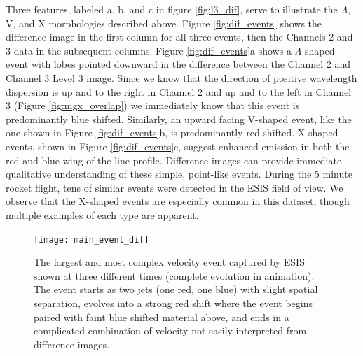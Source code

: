     	Three features, labeled a, b, and c in figure \ref{fig:l3_dif}, serve to illustrate the $\Lambda$, V, and X morphologies described above.
    	Figure \ref{fig:dif_events} shows the difference image in the first column for all three events, then the Channels 2 and 3 data in the subsequent columns. 
    	Figure \ref{fig:dif_events}a shows a $\Lambda$-shaped event with lobes pointed downward in the difference between the Channel 2 and Channel 3 Level 3 image.
    	Since we know that the direction of positive wavelength dispersion is up and to the right in Channel 2 and up and to the left in Channel 3 (Figure \ref{fig:mgx_overlap}) we immediately know that this event is predominantly blue shifted.  
    	Similarly, an upward facing V-shaped event, like the one shown in Figure \ref{fig:dif_events}b, is predominantly red shifted.
    	X-shaped events, shown in Figure \ref{fig:dif_events}c, suggest enhanced emission in both the red and blue wing of the line profile. 
    	Difference images can provide immediate qualitative understanding of these simple, point-like events.  
    	During the 5 minute rocket flight, tens of similar events were detected in the ESIS field of view.  
    	We observe that the X-shaped events are especially common in this dataset, though multiple examples of each 
    	type are apparent.
    	
    	
    	\begin{figure}[htb!]
    		\texttt{[image: main\_event\_dif]}
    		\centering
    		\caption{The largest and most complex velocity event %
    		captured by ESIS shown at three different times (complete evolution in animation). The event starts as two jets (one red, one blue) with slight spatial separation, evolves into a strong red shift where the event begins paired with faint blue shifted material above, and ends in a complicated combination of velocity not easily interpreted from difference images. }
    		\label{fig:main_event}
    	\end{figure}
		
